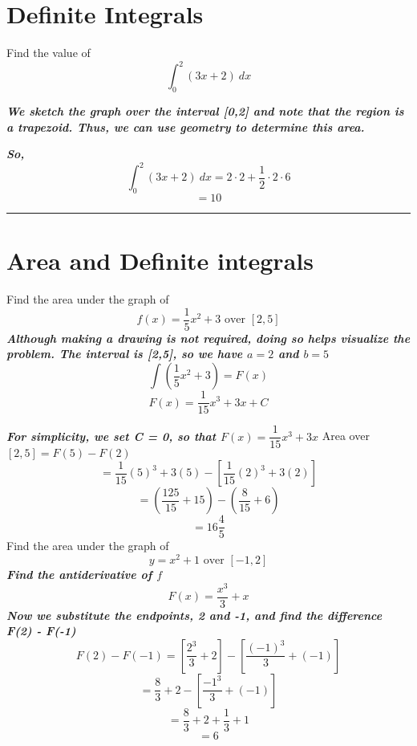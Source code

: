 \documentclass{report}
\begin{document}
\section*{Definite Integrals}
\begin{mdframed}
\q
Find the value of
$$\int_0^2(3x+2)\ dx$$
\end{mdframed}
\sol
\bigbreak \noindent
\textit{\textbf{We sketch the graph over the interval [0,2] and note that the region is a trapezoid. Thus, we can use geometry to determine this area.}}
\begin{figure}[ht]
    \centering
\end{figure}
\textit{\textbf{So,}}
$$ \int_0^2(3x+2)\ dx = 2\cdot 2 + \dfrac{1}{2}\cdot2\cdot 6$$
$$ = 10$$
\bigbreak \noindent
\hrule
\section*{Area and Definite integrals}
\q
Find the area under the graph of
$$f(x) = \dfrac{1}{5}x^2 + 3 \text{ over } [2,5]$$
\sol
\bigbreak \noindent
\textit{\textbf{Although making a drawing is not required, doing so helps visualize the problem. The interval is [2,5], so we have $a=2$ and $b=5$}}
$$\int\left(\dfrac{1}{5}x^2+3\right) = F(x)$$
$$F(x) = \dfrac{1}{15}x^3+3x+C$$ 

\pagebreak \noindent
\textit{\textbf{For simplicity, we set C = 0, so that $F(x) = \dfrac{1}{15}x^3 +3x$}}
\bigbreak \noindent
Area over $[2,5] = F(5) - F(2)$
$$ = \dfrac{1}{15}(5)^3 + 3(5) -  \left[\dfrac{1}{15}(2)^3+3(2)\right]$$
$$ = \left(\dfrac{125}{15}+15\right) - \left(\dfrac{8}{15} + 6\right)$$
$$ = 16\dfrac{4}{5}$$
\bigbreak \noindent
\q
Find the area under the graph of
$$ y=x^2+1 \text{ over } [-1,2]$$
\sol
\bigbreak \noindent
\textit{\textbf{Find the antiderivative of $f$}}
$$ F(x) = \dfrac{x^3}{3}+x $$
\noindent
\textit{\textbf{Now we substitute the endpoints, 2 and -1, and find the difference F(2) - F(-1)}}
$$ F(2) - F(-1) = \left[\dfrac{2^3}{3} + 2\right] - \left[\dfrac{(-1)^3}{3} + (-1)\right]$$
$$ = \dfrac{8}{3} + 2 - \left[\dfrac{-1^3}{3}+(-1)\right]$$
$$ = \dfrac{8}{3}+2+\dfrac{1}{3}+1$$
$$ = 6$$
\bigbreak \noindent
{}
\end{document}
